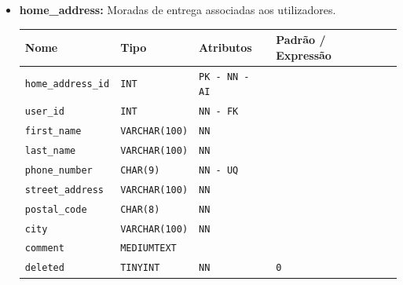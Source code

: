 \begin{itemize}
    \vspace{3pt}
    \item \textbf{home\_address:}
    Moradas de entrega associadas aos utilizadores. 
    \begin{table}[H]
        \centering
        \begin{tabularx}{\linewidth}{XXXXX}
        \toprule
        \textbf{\color{color_scheme}Nome} & \textbf{\color{color_scheme}Tipo} & \textbf{\color{color_scheme}Atributos} & \textbf{\color{color_scheme}Padrão / Expressão}\\
        \midrule
        \texttt{home\_address\_id} & \texttt{INT} & \texttt{PK - NN - AI} &\\
        \texttt{user\_id} & \texttt{INT}  & \texttt{NN - FK}  &  \\
        \texttt{first\_name} & \texttt{VARCHAR(100)}  & \texttt{NN}  & \\
        \texttt{last\_name} & \texttt{VARCHAR(100)}  & \texttt{NN}  & \\
        \texttt{phone\_number} & \texttt{CHAR(9)}  & \texttt{NN - UQ}  & \\
        \texttt{street\_address} & \texttt{VARCHAR(100)}  & \texttt{NN}  & \\
        \texttt{postal\_code} & \texttt{CHAR(8)}  & \texttt{NN}  & \\
        \texttt{city} & \texttt{VARCHAR(100)}  & \texttt{NN}  & \\
        \texttt{comment} & \texttt{MEDIUMTEXT}  &  & \\
        \texttt{deleted} & \texttt{TINYINT}  & \texttt{NN}  & \texttt{0} \\
        \bottomrule
        \end{tabularx}
        \label{table: address_home}
    \end{table}

    \newpage


\end{itemize}
